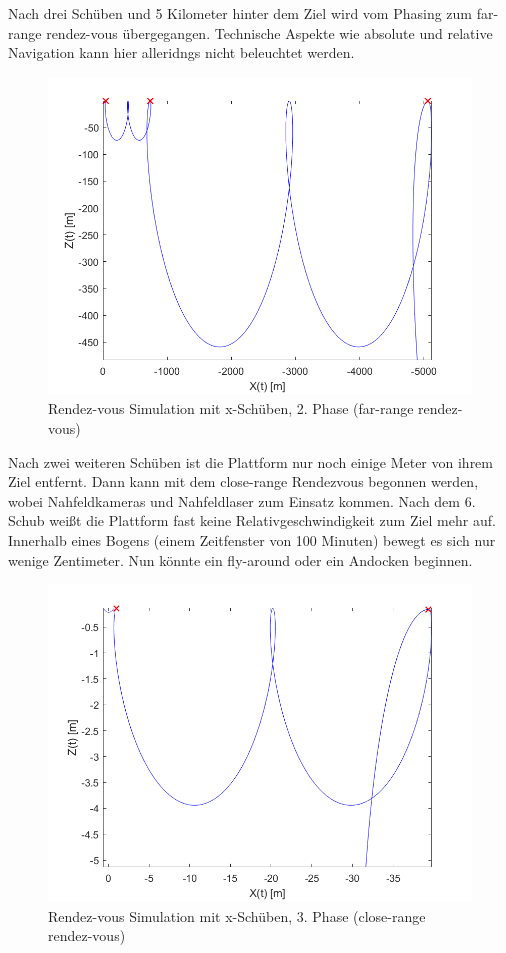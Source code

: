 \documentclass{article}
\begin{document}
\noindent Nach drei Schüben und 5 Kilometer hinter dem Ziel wird vom Phasing zum far-range rendez-vous übergegangen. Technische Aspekte wie absolute und relative Navigation kann hier alleridngs nicht beleuchtet werden.
\begin{figure}[H]
	\centering
	\includegraphics[width=0.6\linewidth]{bilder/RendezvousPhase2A.png}
	\caption{Rendez-vous Simulation mit x-Schüben, 2. Phase (far-range rendez-vous)}
	\label{frrendez}
\end{figure}
\noindent Nach zwei weiteren Schüben ist die Plattform nur noch einige Meter von ihrem Ziel entfernt. Dann kann mit dem close-range Rendezvous begonnen werden, wobei Nahfeldkameras und Nahfeldlaser zum Einsatz kommen. Nach dem 6. Schub weißt die Plattform fast keine Relativgeschwindigkeit zum Ziel mehr auf. Innerhalb eines Bogens (einem Zeitfenster von 100 Minuten) bewegt es sich nur wenige Zentimeter. Nun könnte ein fly-around oder ein Andocken beginnen.
\begin{figure}[H]
	\centering
	\includegraphics[width=0.6\linewidth]{bilder/RendezvousPhase3A.png}
	\caption{Rendez-vous Simulation mit x-Schüben, 3. Phase (close-range rendez-vous)}
	\label{crrendez}
\end{figure}

\clearpage
\end{document}
